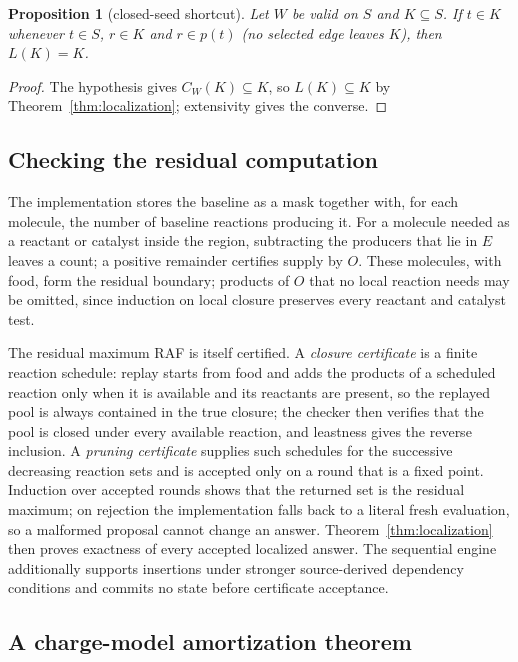 \documentclass[11pt,a4paper]{article}
\theoremstyle{plain}
\newtheorem{proposition}[theorem]{Proposition}
\theoremstyle{definition}
\theoremstyle{remark}
\begin{document}
\begin{proposition}[closed-seed shortcut]\label{prop:closedseed}
Let $W$ be valid on $S$ and $K\subseteq S$. If $t\in K$ whenever $t\in S$, $r\in K$ and $r\in p(t)$ (no selected edge leaves $K$), then $L(K)=K$.
\end{proposition}

\begin{proof}
The hypothesis gives $C_W(K)\subseteq K$, so $L(K)\subseteq K$ by Theorem~\ref{thm:localization}; extensivity gives the converse.
\end{proof}

\subsection{Checking the residual computation}\label{sec:checking}

The implementation stores the baseline as a mask together with, for each molecule, the number of baseline reactions producing it. For a molecule needed as a reactant or catalyst inside the region, subtracting the producers that lie in $E$ leaves a count; a positive remainder certifies supply by $O$. These molecules, with food, form the residual boundary; products of $O$ that no local reaction needs may be omitted, since induction on local closure preserves every reactant and catalyst test.

The residual maximum RAF is itself certified. A \emph{closure certificate} is a finite reaction schedule: replay starts from food and adds the products of a scheduled reaction only when it is available and its reactants are present, so the replayed pool is always contained in the true closure; the checker then verifies that the pool is closed under every available reaction, and leastness gives the reverse inclusion. A \emph{pruning certificate} supplies such schedules for the successive decreasing reaction sets and is accepted only on a round that is a fixed point. Induction over accepted rounds shows that the returned set is the residual maximum; on rejection the implementation falls back to a literal fresh evaluation, so a malformed proposal cannot change an answer. Theorem~\ref{thm:localization} then proves exactness of every accepted localized answer. The sequential engine additionally supports insertions under stronger source-derived dependency conditions and commits no state before certificate acceptance.

\subsection{A charge-model amortization theorem}\label{sec:family}
\end{document}

